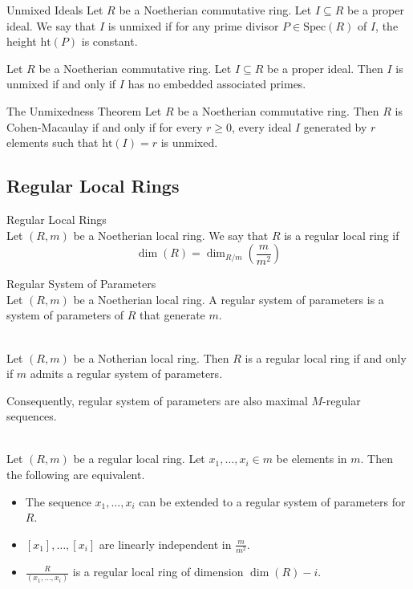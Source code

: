 \documentclass[a4paper]{article}
\begin{document}
\begin{defn}{Unmixed Ideals}{} Let $R$ be a Noetherian commutative ring. Let $I\subseteq R$ be a proper ideal. We say that $I$ is unmixed if for any prime divisor $P\in\text{Spec}(R)$ of $I$, the height $\text{ht}(P)$ is constant. 
\end{defn}

\begin{lmm}{}{} Let $R$ be a Noetherian commutative ring. Let $I\subseteq R$ be a proper ideal. Then $I$ is unmixed if and only if $I$ has no embedded associated primes. 
\end{lmm}

\begin{thm}{The Unmixedness Theorem}{} Let $R$ be a Noetherian commutative ring. Then $R$ is Cohen-Macaulay if and only if for every $r\geq 0$, every ideal $I$ generated by $r$ elements such that $\text{ht}(I)=r$ is unmixed. 
\end{thm}

\subsection{Regular Local Rings}
\begin{defn}{Regular Local Rings}{}\\
Let $(R,m)$ be a Noetherian local ring. We say that $R$ is a regular local ring if $$\dim(R)=\dim_{R/m}\left(\frac{m}{m^2}\right)$$
\end{defn}

\begin{defn}{Regular System of Parameters}{}\\
Let $(R,m)$ be a Noetherian local ring. A regular system of parameters is a system of parameters of $R$ that generate $m$. 
\end{defn}

\begin{prp}{}{}\\
Let $(R,m)$ be a Notherian local ring. Then $R$ is a regular local ring if and only if $m$ admits a regular system of parameters. 
\end{prp}

Consequently, regular system of parameters are also maximal $M$-regular sequences. 

\begin{prp}{}{}\\
Let $(R,m)$ be a regular local ring. Let $x_1,\dots,x_i\in m$ be elements in $m$. Then the following are equivalent. 
\begin{itemize}
\item The sequence $x_1,\dots,x_i$ can be extended to a regular system of parameters for $R$. 
\item $[x_1],\dots,[x_i]$ are linearly independent in $\frac{m}{m^2}$. 
\item $\frac{R}{(x_1,\dots,x_i)}$ is a regular local ring of dimension $\dim(R)-i$. 
\end{itemize}
\end{prp}
\end{document}

